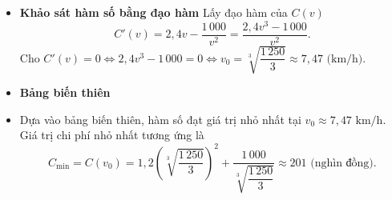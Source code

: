 \begin{ex}
{\begin{itemize}
			Ta có hàm số mô tả chi phí
			\[ C(v) = 1{,}2v^2 + \dfrac{1\,000}{v} \quad \text{với } v \in (0; 120]. \]   
			\item \textbf{Khảo sát hàm số bằng đạo hàm}
			Lấy đạo hàm của $C(v)$
			\[ C'(v) = 2{,}4v - \frac{1\,000}{v^2} = \frac{2{,}4v^3 - 1\,000}{v^2}. \]
			Cho $C'(v) = 0 \Leftrightarrow 2{,}4v^3 - 1\,000 = 0 
			\Leftrightarrow v_0 = \sqrt[3]{\dfrac{1\,250}{3}} \approx 7{,}47 \text{ (km/h)}.$
			\item \textbf{Bảng biến thiên}
			\begin{center}
			\end{center}
			\item Dựa vào bảng biến thiên, hàm số đạt giá trị nhỏ nhất tại $v_0 \approx 7{,}47\text{ km/h}$. 
			Giá trị chi phí nhỏ nhất tương ứng là
			\[ C_{\min} = C(v_0) = 1{,}2 \left(\sqrt[3]{\dfrac{1\,250}{3}}\right)^2 + \dfrac{1\,000}{\sqrt[3]{\dfrac{1\,250}{3}}} \approx 201 \text{ (nghìn đồng)}. \]
		\end{itemize}
	}
\end{ex}

